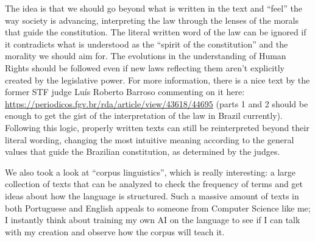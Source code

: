 The idea is that we should go beyond what is written in the text and ``feel'' the way society is advancing, interpreting the law through the lenses of the morals that guide the constitution. The literal written word of the law can be ignored if it contradicts what is understood as the ``spirit of the constitution'' and the morality we should aim for. The evolutions in the understanding of Human Rights should be followed even if new laws reflecting them aren't explicitly created by the legislative power. For more information, there is a nice text by the former STF judge Luís Roberto Barroso commenting on it here: \url{https://periodicos.fgv.br/rda/article/view/43618/44695} (parts 1 and 2 should be enough to get the gist of the interpretation of the law in Brazil currently). Following this logic, properly written texts can still be reinterpreted beyond their literal wording, changing the most intuitive meaning according to the general values that guide the Brazilian constitution, as determined by the judges.

We also took a look at ``corpus linguistics'', which is really interesting: a large collection of texts that can be analyzed to check the frequency of terms and get ideas about how the language is structured. Such a massive amount of texts in both Portuguese and English appeals to someone from Computer Science like me; I instantly think about training my own AI on the language to see if I can talk with my creation and observe how the corpus will teach it.